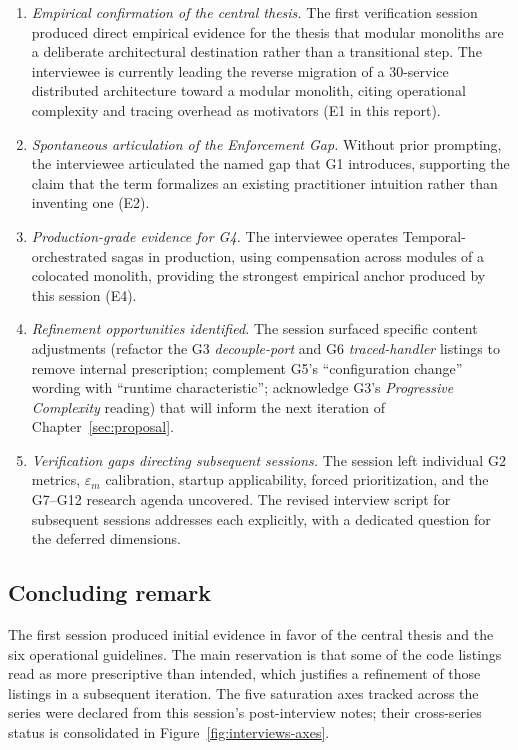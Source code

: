 \begin{enumerate}[itemsep=3pt,topsep=2pt]
  \item \emph{Empirical confirmation of the central thesis.} The first verification session produced direct empirical evidence for the thesis that modular monoliths are a deliberate architectural destination rather than a transitional step. The interviewee is currently leading the reverse migration of a 30-service distributed architecture toward a modular monolith, citing operational complexity and tracing overhead as motivators (E1 in this report).
  \item \emph{Spontaneous articulation of the Enforcement Gap.} Without prior prompting, the interviewee articulated the named gap that G1 introduces, supporting the claim that the term formalizes an existing practitioner intuition rather than inventing one (E2).
  \item \emph{Production-grade evidence for G4.} The interviewee operates Temporal-orchestrated sagas in production, using compensation across modules of a colocated monolith, providing the strongest empirical anchor produced by this session (E4).
  \item \emph{Refinement opportunities identified.} The session surfaced specific content adjustments (refactor the G3 \emph{decouple-port} and G6 \emph{traced-handler} listings to remove internal prescription; complement G5's ``configuration change'' wording with ``runtime characteristic''; acknowledge G3's \emph{Progressive Complexity} reading) that will inform the next iteration of Chapter~\ref{sec:proposal}.
  \item \emph{Verification gaps directing subsequent sessions.} The session left individual G2 metrics, $\varepsilon_m$ calibration, startup applicability, forced prioritization, and the G7--G12 research agenda uncovered. The revised interview script for subsequent sessions addresses each explicitly, with a dedicated question for the deferred dimensions.
\end{enumerate}

\subsection*{Concluding remark}

The first session produced initial evidence in favor of the central thesis and the six operational guidelines. The main reservation is that some of the code listings read as more prescriptive than intended, which justifies a refinement of those listings in a subsequent iteration. The five saturation axes tracked across the series were declared from this session's post-interview notes; their cross-series status is consolidated in Figure~\ref{fig:interviews-axes}.
